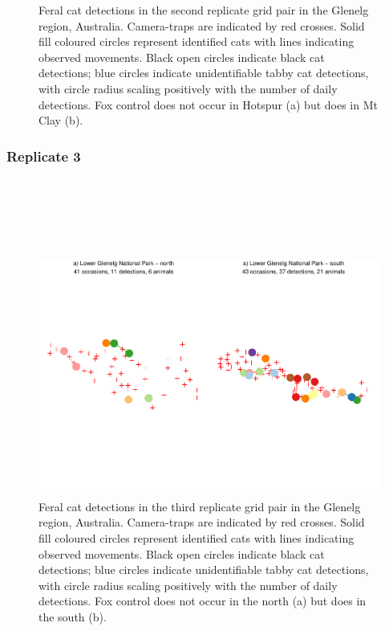 \documentclass[11pt,a4paper,titlepage,twoside,openright]{style/unimelbthesis}
\begin{document}
\begin{mainmatter}
\begin{figure}
{}

\caption{Feral cat detections in the second replicate grid pair in the Glenelg region, Australia. Camera-traps are indicated by red crosses. Solid fill coloured circles represent identified cats with lines indicating observed movements. Black open circles indicate black cat detections; blue circles indicate unidentifiable tabby cat detections, with circle radius scaling positively with the number of daily detections. Fox control does not occur in Hotspur (a) but does in Mt Clay (b).}\label{fig:density-plot-ch-2}
\end{figure}
\newpage

\hypertarget{replicate-3}{%
\subsubsection{Replicate 3}\label{replicate-3}}

\(~\)

\(~\)

\(~\)
\begin{figure}

{\centering \includegraphics[width=1\linewidth]{figure/density-plot-ch-3-1} 

}

\caption{Feral cat detections in the third replicate grid pair in the Glenelg region, Australia. Camera-traps are indicated by red crosses. Solid fill coloured circles represent identified cats with lines indicating observed movements. Black open circles indicate black cat detections; blue circles indicate unidentifiable tabby cat detections, with circle radius scaling positively with the number of daily detections. Fox control does not occur in the north (a) but does in the south (b).}\label{fig:density-plot-ch-3}
\end{figure}
\newpage


\end{mainmatter}
\end{document}
